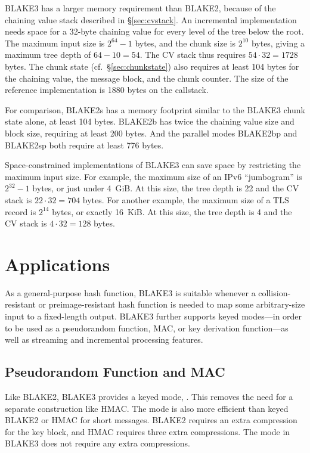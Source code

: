 \documentclass[11pt,notitlepage,a4paper]{article}
\newcommand{\flag}[1]{\texttt{\detokenize{#1}}\xspace}
\begin{document}
BLAKE3 has a larger memory requirement than BLAKE2, because of the chaining
value stack described in \S\ref{sec:cvstack}. An incremental implementation
needs space for a 32-byte chaining value for every level of the tree below the
root. The maximum input size is $2^{64}-1$ bytes, and the chunk size is
$2^{10}$ bytes, giving a maximum tree depth of $64 - 10 = 54$. The CV stack
thus requires $54 \cdot 32 = 1728$ bytes. The chunk state
(cf.~\S\ref{sec:chunkstate}) also requires at least 104 bytes for the chaining
value, the message block, and the chunk counter. The size of the reference
implementation is 1880 bytes on the callstack.

For comparison, BLAKE2s has a memory footprint similar to the BLAKE3 chunk
state alone, at least 104 bytes. BLAKE2b has twice the chaining value size and
block size, requiring at least 200 bytes. And the parallel modes BLAKE2bp and
BLAKE2sp both require at least 776 bytes.

Space-constrained implementations of BLAKE3 can save space by restricting the
maximum input size. For example, the maximum size of an IPv6 ``jumbogram'' is
$2^{32}-1$ bytes, or just under 4~GiB. At this size, the tree depth is 22 and
the CV stack is $22 \cdot 32 = 704$ bytes. For another example, the maximum
size of a TLS record is $2^{14}$ bytes, or exactly 16~KiB. At this size, the
tree depth is 4 and the CV stack is $4 \cdot 32 = 128$ bytes.

\section{Applications}\label{sec:applications}

As a general-purpose hash function, BLAKE3 is suitable whenever a
collision-resistant or preimage-resistant hash function is needed to map
some arbitrary-size input to a fixed-length output.
BLAKE3 further supports keyed modes---in order to be used as a pseudorandom
function, MAC, or key derivation function---as well as streaming and
incremental processing features.

\subsection{Pseudorandom Function and MAC}\label{sec:mac}

Like BLAKE2, BLAKE3 provides a keyed mode, \flag{keyed_hash}. This removes the
need for a separate construction like HMAC. The \flag{keyed_hash} mode is also
more efficient than keyed BLAKE2 or HMAC for short messages. BLAKE2 requires an
extra compression for the key block, and HMAC requires three extra
compressions. The \flag{keyed_hash} mode in BLAKE3 does not require any extra
compressions.
\end{document}
